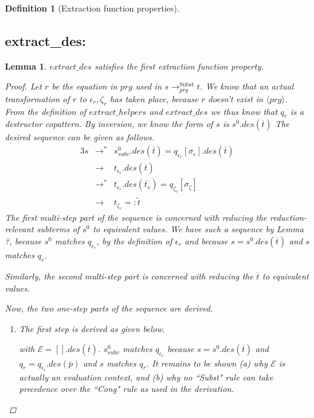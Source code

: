 \documentclass[11pt]{article} %
\newtheorem*{lemma*}{Lemma}
\newtheorem*{definition*}{Definition}
\begin{document}
\begin{framed}
\begin{definition*}[Extraction function properties]
\begin{enumerate}
\end{enumerate}

\end{definition*}

\subsection*{extract\_des:}

\begin{lemma*}

$extract\_des$ satisfies the first extraction function property.

\begin{proof}

Let $r$ be the equation in $prg$ used in $s \longrightarrow^{\textrm{Subst}}_{prg} t$. We know that an actual transformation of $r$ to $\epsilon_r, \zeta_r$ has taken place, because $r$ doesn't exist in $\langle prg \rangle$. From the definition of $extract\_helpers$ and $extract\_des$ we thus know that $q_r$ is a destructor copattern. By inversion, we know the form of $s$ is $s^0.des(\overline{t})$ The desired sequence can be given as follows.
\begin{alignat*}{3}
s &\longrightarrow^* &s^0_{subv}.des(\overline{t}) = q_{\epsilon_r}[\sigma_\epsilon].des(\overline{t})\\
&\longrightarrow &t_{\epsilon_r}.des(\overline{t})\\
&\longrightarrow^*  &t_{\epsilon_r}.des(\overline{t_v}) = q_{\zeta_r}[\sigma_\zeta]\\
&\longrightarrow &t_{\zeta_r} =: \widetilde{t}
\end{alignat*}
The first multi-step part of the sequence is concerned with reducing the reduction-relevant subterms of $s^0$ to equivalent values. We have such a sequence by Lemma ?, because $s^0$ matches $q_{\epsilon_r}$, by the definition of $\epsilon_r$ and because $s = s^0.des(\overline{t})$ and $s$ matches $q_r$.

Similarly, the second multi-step part is concerned with reducing the $\overline{t}$ to equivalent values.

Now, the two one-step parts of the sequence are derived.
\begin{enumerate}
\item The first step is derived as given below.
\begin{prooftree}
\end{prooftree}
with $\mathcal{E} = [].des(\overline{t})$. $s^0_{subv}$ matches $q_{\epsilon_r}$ because $s = s^0.des(\overline{t})$ and $q_r = q_{\epsilon_r}.des(\overline{p})$ and $s$ matches $q_r$. It remains to be shown (a) why $\mathcal{E}$ is actually an evaluation context, and (b) why no ``Subst" rule can take precedence over the ``Cong" rule as used in the derivation.


\end{enumerate}
\end{proof}
\end{lemma*}
\end{framed}
\end{document}
